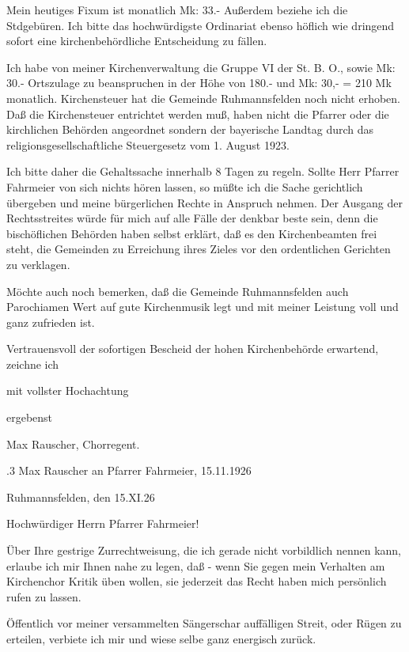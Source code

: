 Mein heutiges Fixum ist monatlich Mk: 33.- Außerdem beziehe ich die Stdgebüren.
Ich bitte das hochwürdigste Ordinariat ebenso höflich wie dringend sofort eine
kirchenbehördliche Entscheidung zu fällen.

Ich habe von meiner Kirchenverwaltung die Gruppe VI der St. B. O., sowie Mk:
30.- Ortszulage zu beanspruchen in der Höhe von 180.- und Mk: 30,- = 210 Mk
monatlich. Kirchensteuer hat die Gemeinde Ruhmannsfelden noch nicht erhoben. Daß
die Kirchensteuer entrichtet werden muß, haben nicht die Pfarrer oder die
kirchlichen Behörden angeordnet sondern der bayerische Landtag durch das
religionsgesellschaftliche Steuergesetz vom 1. August 1923.

Ich bitte daher die Gehaltssache innerhalb 8 Tagen zu regeln. Sollte Herr
Pfarrer Fahrmeier von sich nichts hören lassen, so müßte ich die Sache
gerichtlich übergeben und meine bürgerlichen Rechte in Anspruch nehmen. Der
Ausgang der Rechtsstreites würde für mich auf alle Fälle der denkbar beste sein,
denn die bischöflichen Behörden haben selbst erklärt, daß es den Kirchenbeamten
frei steht, die Gemeinden zu Erreichung ihres Zieles vor den ordentlichen
Gerichten zu verklagen.

Möchte auch noch bemerken, daß die Gemeinde Ruhmannsfelden auch Parochiamen Wert
auf gute Kirchenmusik legt und mit meiner Leistung voll und ganz zufrieden ist.

Vertrauensvoll der sofortigen Bescheid der hohen Kirchenbehörde erwartend,
zeichne ich



mit vollster Hochachtung

ergebenst

Max Rauscher, Chorregent.

.3 Max Rauscher an Pfarrer Fahrmeier, 15.11.1926

Ruhmannsfelden, den 15.XI.26



Hochwürdiger Herrn Pfarrer Fahrmeier!



Über Ihre gestrige Zurrechtweisung, die ich gerade nicht vorbildlich nennen
kann, erlaube ich mir Ihnen nahe zu legen, daß - wenn Sie gegen mein Verhalten
am Kirchenchor Kritik üben wollen, sie jederzeit das Recht haben mich persönlich
rufen zu lassen.

Öffentlich vor meiner versammelten Sängerschar auffälligen Streit, oder Rügen zu
erteilen, verbiete ich mir und wiese selbe ganz energisch zurück.

